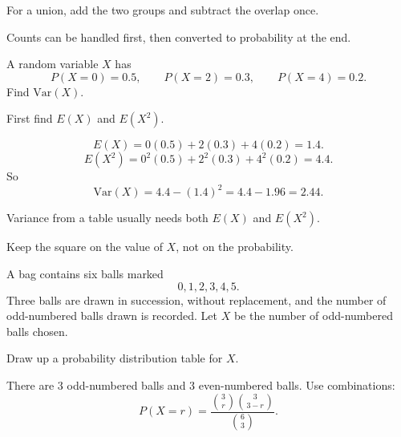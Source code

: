 \begin{takeaways}
\item For a union, add the two groups and subtract the overlap once.
\item Counts can be handled first, then converted to probability at the end.
\end{takeaways}

\begin{problem}
A random variable $X$ has
\[
P(X=0)=0.5,\qquad P(X=2)=0.3,\qquad P(X=4)=0.2.
\]
Find $\mathrm{Var}(X)$.
\end{problem}

\begin{hint}
First find $E(X)$ and $E(X^2)$.
\end{hint}

\begin{solution}
\[
E(X)=0(0.5)+2(0.3)+4(0.2)=1.4.
\]
\[
E(X^2)=0^2(0.5)+2^2(0.3)+4^2(0.2)=4.4.
\]
So
\[
\mathrm{Var}(X)=4.4-(1.4)^2=4.4-1.96=2.44.
\]
\end{solution}

\begin{takeaways}
\item Variance from a table usually needs both $E(X)$ and $E(X^2)$.
\item Keep the square on the value of $X$, not on the probability.
\end{takeaways}

\begin{problem}
A bag contains six balls marked
\[
0,1,2,3,4,5.
\]
Three balls are drawn in succession, without replacement, and the number of odd-numbered balls drawn is recorded. Let $X$ be the number of odd-numbered balls chosen.

Draw up a probability distribution table for $X$.
\end{problem}

\begin{hint}
There are $3$ odd-numbered balls and $3$ even-numbered balls. Use combinations:
\[
P(X=r)=\frac{\binom{3}{r}\binom{3}{3-r}}{\binom{6}{3}}.
\]
\end{hint}

